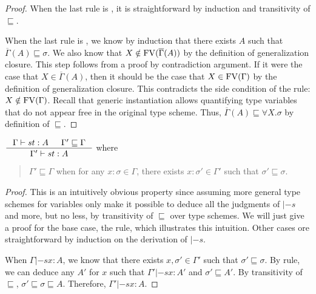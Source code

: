 \begin{proof}
When the last rule is , it is straightforward by induction
and transitivity of $\sqsubseteq$.

When the last rule is , we know by induction that there exists
$A$ such that $\overline{\Gamma}(A) \sqsubseteq \sigma$. We also know
that $X \notin\mathop{\mathrm{FV}}(\overline{\Gamma}(A))$ by the definition of generalization closure.
This step follows from a proof by contradiction argument.
If it were the case that $X\in\overline{\Gamma}(A)$, then it should be the case that
$X\in\mathop{\mathrm{FV}}(\Gamma)$
by the definition of generalization closure. This contradicts the side condition of
the  rule: $X\notin\mathop{\mathrm{FV}}(\Gamma)$.
Recall that generic instantiation allows quantifying type variables
that do not appear free in the original type scheme. Thus,
$\overline{\Gamma}(A) \sqsubseteq \forall X.\sigma$ by definition
of $\sqsubseteq$.
\end{proof}

\begin{lemma} \label{lem:genGamma}
$ \inference{\Gamma |-s t : A & \Gamma' \sqsubseteq \Gamma}
            {\Gamma' |-s t : A} $ where
\begin{quote}
$\Gamma' \sqsubseteq \Gamma$ when for any $x:\sigma\in \Gamma$,
there exists $x:\sigma'\in\Gamma'$ such that $\sigma'\sqsubseteq\sigma$.
\end{quote}
\label{lem:generalizeGamma}
\end{lemma}
\begin{proof}
This is an intuitively obvious property since assuming
more general type schemes for variables only make
it possible to deduce all the judgments of $|-s$ and more, but no less,
by transitivity of $\sqsubseteq$ over type schemes.
We will just give a proof for the base case, the  rule,
which illustrates this intuition.
Other cases ore straightforward by induction on the derivation of $|-s$.

When $\Gamma |-s x : A$, we know that there exists
$x,\sigma'\in\Gamma'$ such that $\sigma'\sqsubseteq\sigma$.
By  rule, we can deduce any $A'$ for $x$
such that $\Gamma' |-s x : A'$ and $\sigma'\sqsubseteq A'$.
By transitivity of $\sqsubseteq$, $\sigma' \sqsubseteq \sigma \sqsubseteq A$.
Therefore, $\Gamma' |-s x : A$.
\end{proof}

